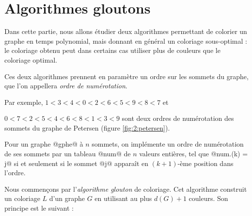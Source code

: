 \section{Algorithmes gloutons} 
Dans cette partie, nous allons étudier deux algorithmes permettant de colorier un graphe en temps polynomial, mais donnant en général un coloriage sous-optimal : le coloriage obtenu peut dans certains cas utiliser plus de couleurs que le coloriage optimal. 

\medskip

Ces deux algorithmes prennent en paramètre un ordre sur les sommets du graphe, que l'on appellera \emph{ordre de numérotation}. 

Par exemple, $1<3<4<0<2<6<5<9<8<7$ et 

$0<7<2<5<4<6<8<1<3<9$ sont deux ordres de numérotation des sommets du graphe de Petersen (figure \ref{fig:2:petersen}).

\medskip

Pour un graphe @gphe@ à $n$ sommets, on implémente un ordre de numérotation de ses sommets par un tableau @num@ de $n$ valeurs entières, tel que @num.(k) = j@ si et seulement si le sommet @j@ apparaît en $(k+1)$-ème position dans l'ordre. 

\medskip

Nous commençons par l'\emph{algorithme glouton} de coloriage. Cet algorithme construit un coloriage $L$ d'un graphe $G$ en utilisant au plus $d(G)+1$ couleurs. Son principe est le suivant :

